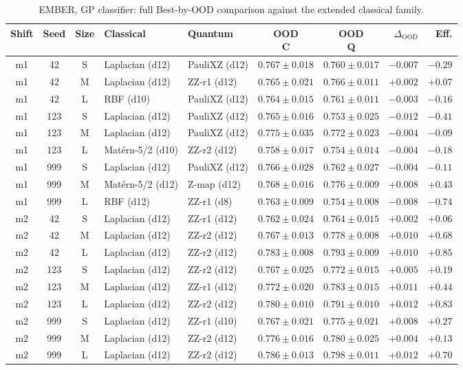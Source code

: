 \documentclass[journal]{IEEEtran}
\begin{document}
\begin{table}[!t]
\centering
\caption{EMBER, GP classifier: full Best-by-OOD comparison against the extended classical family.}
\label{app:ember_gpc}
\scriptsize
\setlength{\tabcolsep}{2pt}
\begin{tabular}{@{}ccc ll cc rr@{}}
\toprule
Shift & Seed & Size & Classical & Quantum & \shortstack{OOD\\C} & \shortstack{OOD\\Q} & $\Delta_{\mathrm{OOD}}$ & Eff. \\
\midrule
m1 & 42 & S & Laplacian (d12) & PauliXZ (d12) & $0.767\pm0.018$ & $0.760\pm0.017$ & $-0.007$ & $-0.29$ \\
m1 & 42 & M & Laplacian (d12) & ZZ-r1 (d12) & $0.765\pm0.021$ & $0.766\pm0.011$ & $+0.002$ & $+0.07$ \\
m1 & 42 & L & RBF (d10) & PauliXZ (d12) & $0.764\pm0.015$ & $0.761\pm0.011$ & $-0.003$ & $-0.16$ \\
m1 & 123 & S & Laplacian (d12) & PauliXZ (d12) & $0.765\pm0.016$ & $0.753\pm0.025$ & $-0.012$ & $-0.41$ \\
m1 & 123 & M & Laplacian (d12) & PauliXZ (d12) & $0.775\pm0.035$ & $0.772\pm0.023$ & $-0.004$ & $-0.09$ \\
m1 & 123 & L & Mat\'ern-5/2 (d10) & ZZ-r2 (d12) & $0.758\pm0.017$ & $0.754\pm0.014$ & $-0.004$ & $-0.18$ \\
m1 & 999 & S & Laplacian (d12) & PauliXZ (d12) & $0.766\pm0.028$ & $0.762\pm0.027$ & $-0.004$ & $-0.11$ \\
m1 & 999 & M & Mat\'ern-5/2 (d12) & Z-map (d12) & $0.768\pm0.016$ & $0.776\pm0.009$ & $+0.008$ & $+0.43$ \\
m1 & 999 & L & RBF (d12) & ZZ-r1 (d8) & $0.763\pm0.009$ & $0.754\pm0.008$ & $-0.008$ & $-0.74$ \\
m2 & 42 & S & Laplacian (d12) & ZZ-r1 (d12) & $0.762\pm0.024$ & $0.764\pm0.015$ & $+0.002$ & $+0.06$ \\
m2 & 42 & M & Laplacian (d12) & ZZ-r2 (d12) & $0.767\pm0.013$ & $0.778\pm0.008$ & $+0.010$ & $+0.68$ \\
m2 & 42 & L & Laplacian (d12) & ZZ-r2 (d12) & $0.783\pm0.008$ & $0.793\pm0.009$ & $+0.010$ & $+0.85$ \\
m2 & 123 & S & Laplacian (d12) & ZZ-r2 (d12) & $0.767\pm0.025$ & $0.772\pm0.015$ & $+0.005$ & $+0.19$ \\
m2 & 123 & M & Laplacian (d12) & ZZ-r1 (d12) & $0.772\pm0.020$ & $0.783\pm0.015$ & $+0.011$ & $+0.44$ \\
m2 & 123 & L & Laplacian (d12) & ZZ-r2 (d12) & $0.780\pm0.010$ & $0.791\pm0.010$ & $+0.012$ & $+0.83$ \\
m2 & 999 & S & Laplacian (d12) & ZZ-r1 (d10) & $0.767\pm0.021$ & $0.775\pm0.021$ & $+0.008$ & $+0.27$ \\
m2 & 999 & M & Laplacian (d12) & ZZ-r2 (d12) & $0.776\pm0.016$ & $0.780\pm0.025$ & $+0.004$ & $+0.13$ \\
m2 & 999 & L & Laplacian (d12) & ZZ-r2 (d12) & $0.786\pm0.013$ & $0.798\pm0.011$ & $+0.012$ & $+0.70$ \\\bottomrule
\end{tabular}
\end{table}
\end{document}
